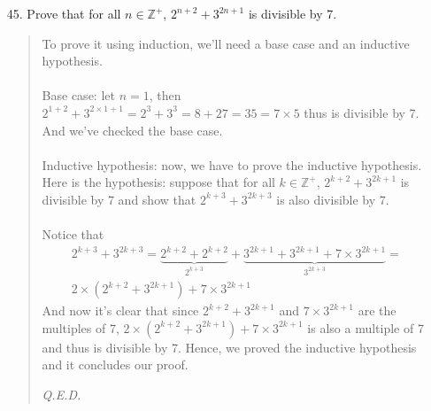 \documentclass[12pt, a4paper]{article}                      %
\newcommand{\intzp}{\mathbb{Z^+}}
\begin{document}
\begin{itemize}
\item[45.]
Prove that for all $n \in \intzp$, $2^{n + 2} + 3^{2n + 1}$ is divisible by 7.
\begin{quote}
To prove it using induction, we'll need a base case and an inductive hypothesis.\\\\
Base case: let $n = 1$, then $2^{1 + 2} + 3^{2 \times 1 + 1} = 2^3 + 3^3 = 8 + 27 = 35 = 7 \times 5$ thus is divisible
by 7. And we've checked the base case.\\\\
Inductive hypothesis: now, we have to prove the inductive hypothesis. Here is the hypothesis:
suppose that for all $k \in \intzp$, $2^{k + 2} + 3^{2k + 1}$ is divisible by 7 and show that
$2^{k + 3} + 3^{2k + 3}$ is also divisible by 7.\\\\
Notice that
\begin{align*}
2^{k + 3} + 3^{2k + 3} = \underbrace{2^{k + 2} + 2^{k + 2}}_{2^{k + 3}} + \underbrace{3^{2k + 1} + 3^{2k + 1} + 7 \times 3^{2k + 1}}_{3^{2k + 3}} =\\
2 \times (2^{k + 2} + 3 ^ {2k + 1}) + 7 \times 3^{2k + 1}
\end{align*}
And now it's clear that since $2^{k + 2} + 3 ^ {2k + 1}$ and $7 \times 3^{2k + 1}$ are the multiples of 7,
$2 \times (2^{k + 2} + 3 ^ {2k + 1}) + 7 \times 3^{2k + 1}$ is also a multiple of 7 and thus is divisible by 7.
Hence, we proved the inductive hypothesis and it concludes our proof.
\begin{flushright}
\textit{Q.E.D.}
\end{flushright}
\end{quote}

\item[]
\item[]


\end{itemize}
\end{document}
